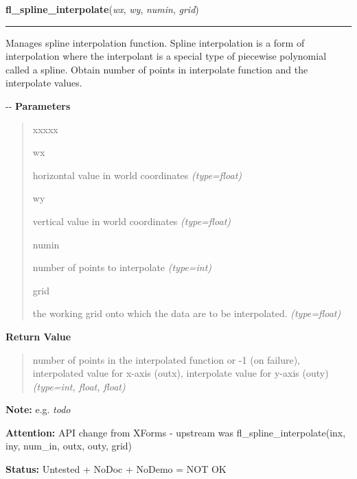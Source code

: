 \hspace{.8\funcindent}\begin{boxedminipage}{\funcwidth}

    \raggedright \textbf{fl\_spline\_interpolate}(\textit{wx}, \textit{wy}, \textit{numin}, \textit{grid})

    \vspace{-1.5ex}

    \rule{\textwidth}{0.5\fboxrule}
\setlength{\parskip}{2ex}

Manages spline interpolation function. Spline interpolation is a form
of interpolation where the interpolant is a special type of piecewise
polynomial called a spline. Obtain number of points in interpolate
function and the interpolate values.

-{}-
\setlength{\parskip}{1ex}
      \textbf{Parameters}
      \vspace{-1ex}

      \begin{quote}
        \begin{Ventry}{xxxxx}

          \item[wx]


horizontal value in world coordinates
            {\it (type=float)}

          \item[wy]


vertical value in world coordinates
            {\it (type=float)}

          \item[numin]


number of points to interpolate
            {\it (type=int)}

          \item[grid]


the working grid onto which the data are to be interpolated.
            {\it (type=float)}

        \end{Ventry}

      \end{quote}

      \textbf{Return Value}
    \vspace{-1ex}

      \begin{quote}

number of points in the interpolated function or -1 (on failure),
interpolated value for x-axis (outx), interpolate value for y-axis
(outy)
      {\it (type=int, float, float)}

      \end{quote}

\textbf{Note:} 
e.g. \emph{todo}


\textbf{Attention:} 
API change from XForms - upstream was
fl\_spline\_interpolate(inx, iny, num\_in, outx, outy, grid)


\textbf{Status:} 
Untested + NoDoc + NoDemo = NOT OK


    \end{boxedminipage}

